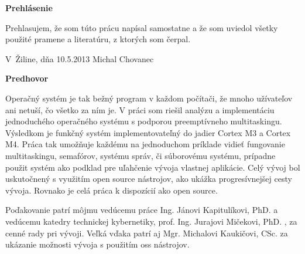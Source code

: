 \newpage

\centerline{\bf Prehlásenie}

\vspace{2em}

\noindent
Prehlasujem, že som túto prácu napísal samostatne a že som uviedol 
všetky použité pramene a literatúru, z ktorých som čerpal. 

\vspace{2em}

\noindent
V~Žiline, dňa 10.5.2013
\hfill
Michal Chovanec



\newpage
{\Large \bf{Predhovor}}


Operačný systém je tak bežný program v každom počítači, že mnoho užívateľov ani netuší, čo všetko za ním je. V práci som riešil analýzu a implementáciu jednoduchého operačného systému s podporou preemptívneho multitaskingu. Výsledkom je funkčný systém implementovateľný do jadier Cortex M3 a Cortex M4. Práca tak umožňuje každému na jednoduchom príklade vidieť fungovanie multitaskingu, semafórov, systému správ, či súborovému systému, prípadne použit systém ako podklad pre uľahčenie vývoja vlastnej aplikácie. Celý vývoj bol uskutočnený s využitím open source nástrojov, ako ukážka progresívnejšej cesty vývoja. Rovnako je celá práca k dispozícií ako open source.

Poďakovanie patrí môjmu vedúcemu práce Ing. Jánovi Kapitulíkovi, PhD. a vedúcemu katedry technickej kybernetiky, prof. Ing. Jurajovi Mičekovi, PhD. , za cenné rady pri vývoji. Veľká vďaka patrí aj Mgr. Michalovi Kaukičovi, CSc. za ukázanie možnosti vývoja s použitím oss nástrojov.
